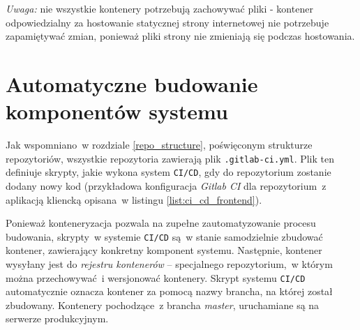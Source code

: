 \textit{Uwaga:} nie wszystkie kontenery potrzebują zachowywać pliki - kontener
odpowiedzialny za hostowanie statycznej strony internetowej nie potrzebuje
zapamiętywać zmian, ponieważ pliki strony nie zmieniają się podczas hostowania. 

\section{Automatyczne budowanie komponentów systemu}

Jak wspomniano~w rozdziale \ref{repo_structure}, poświęconym strukturze repozytoriów,
wszystkie repozytoria zawierają plik \texttt{.gitlab-ci.yml}. Plik ten definiuje skrypty,
jakie wykona system \texttt{CI/CD}, gdy do repozytorium zostanie dodany nowy kod
(przykładowa konfiguracja \textit{Gitlab CI} dla repozytorium~z aplikacją kliencką
opisana~w listingu \ref{list:ci_cd_frontend}).

Ponieważ konteneryzacja pozwala na zupełne zautomatyzowanie procesu budowania,
skrypty~w systemie \texttt{CI/CD} są~w stanie samodzielnie zbudować kontener,
zawierający konkretny komponent systemu. Następnie, kontener wysyłany jest
do \textit{rejestru kontenerów} -- specjalnego repozytorium,~w którym można
przechowywać~i wersjonować kontenery. Skrypt systemu \texttt{CI/CD} automatycznie oznacza
kontener za pomocą nazwy brancha, na której został zbudowany. Kontenery pochodzące~z brancha \textit{master}, uruchamiane są na serwerze produkcyjnym.

